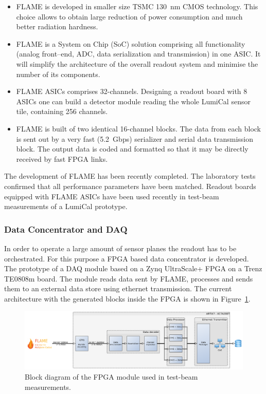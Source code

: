 \begin{itemize}
\item{FLAME is developed in smaller size TSMC 130~nm CMOS technology.
 This choice allows to obtain large reduction of power consumption and much better radiation hardness}.
\item{FLAME is a System on Chip (SoC) solution comprising all functionality
  (analog front--end, ADC, data serialization and transmission) in one ASIC.
  It will simplify the architecture of the overall readout system and minimise the number of its components.}
\item{FLAME ASICs comprises 32-channels. Designing a readout board with 8 ASICs one can build a detector module
  reading the whole LumiCal sensor tile, containing 256 channels.}
\item{FLAME is built of two identical 16-channel blocks. The data from each block is sent out
  by a very fast (\SI{5.2}{Gbps}) serializer and serial data transmission block. The output data is coded and formatted so that it may be directly received by fast FPGA links.}
\end{itemize}
The development of FLAME has been recently completed. The laboratory tests confirmed that all performance parameters have been matched. Readout boards equipped with FLAME ASICs have been used recently in test-beam measurements of a LumiCal prototype.  

\subsubsection{Data Concentrator and DAQ}

In order to operate a large amount of sensor planes the readout has to be orchestrated.
For this purpose a FPGA based data concentrator is developed.
The prototype of a DAQ  module  based on a Zynq UltraScale+ FPGA on a Trenz TE0808m board.
The module reads data sent by FLAME, processes and sends them to an external data store using ethernet transmission. 
The current architecture with the generated blocks inside the FPGA is shown in Figure~\ref{fig:FPGA_scheme}. 

\begin{figure}
\centering
    \includegraphics[width=\textwidth]{Calorimeter/FCAL/figs/FPGA_scheme} 
	\caption{Block diagram of the FPGA module used in test-beam measurements.}
    \label{fig:FPGA_scheme}
\end{figure}

